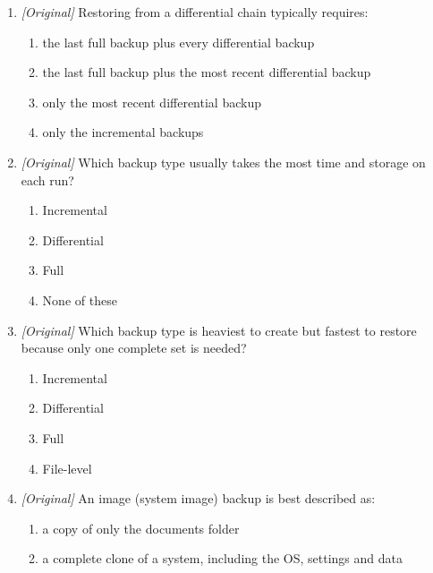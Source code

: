 \begin{enumerate}[label=\textbf{Q\arabic*.}, leftmargin=*]
  requires:
  \begin{enumerate}[label=\Alph*.]
    \item the last full backup plus every incremental backup in sequence
    \item only the most recent incremental backup
    \item only the most recent differential backup
    \item the image backup alone
  \end{enumerate}
\item \textit{[Original]} Restoring from a differential chain typically
  requires:
  \begin{enumerate}[label=\Alph*.]
    \item the last full backup plus every differential backup
    \item the last full backup plus the most recent differential backup
    \item only the most recent differential backup
    \item only the incremental backups
  \end{enumerate}
\item \textit{[Original]} Which backup type usually takes the most time and
  storage on each run?
  \begin{enumerate}[label=\Alph*.]
    \item Incremental
    \item Differential
    \item Full
    \item None of these
  \end{enumerate}
\item \textit{[Original]} Which backup type is heaviest to create but
  fastest to restore because only one complete set is needed?
  \begin{enumerate}[label=\Alph*.]
    \item Incremental
    \item Differential
    \item Full
    \item File-level
  \end{enumerate}
\item \textit{[Original]} An image (system image) backup is best described
  as:
  \begin{enumerate}[label=\Alph*.]
    \item a copy of only the documents folder
    \item a complete clone of a system, including the OS, settings and data

\end{enumerate}
\end{enumerate}
